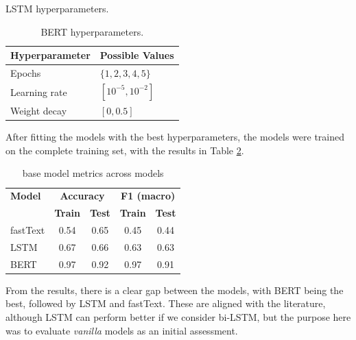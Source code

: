 \documentclass[conference]{IEEEtran}
\begin{document}
\begin{table}[H]
\begin{subtable}[t]{0.45\textwidth}
        \caption{LSTM hyperparameters.}
        \vspace{.1em}
        \label{parameters_baselstm}
    \end{subtable}
    \begin{subtable}[t]{0.45\textwidth}
        \centering
        \begin{tabular}{ll}
        \toprule
        \textbf{Hyperparameter} & \textbf{Possible Values} \\
        \midrule
        Epochs \phantom{abcng disnsin} & $\{1,2,3,4,5\}$ \phantom{onds} \\
        Learning rate & $[10^{-5}, 10^{-2}]$ \\
        Weight decay & $[0, 0.5]$ \\
        \bottomrule
        \end{tabular}
        \vspace{.3em}
        \caption{BERT hyperparameters.}
        \label{parameters_basebert}
    \end{subtable}
\end{table}

After fitting the models with the best hyperparameters, the models were trained on the complete training set, with the results in Table \ref{basemodel_models}.

\begin{table}[H]
\centering
\caption{base model metrics across models}
\label{basemodel_models}
\begin{tabular}{lcccc}
\toprule
\textbf{Model} & \multicolumn{2}{c}{\textbf{Accuracy}} & \multicolumn{2}{c}{\textbf{F1 (macro)}} \\
\cmidrule(lr){2-3} \cmidrule(lr){4-5}
 & \textbf{Train} & \textbf{Test} & \textbf{Train} & \textbf{Test} \\
\midrule
fastText & 0.54 & 0.65 & 0.45 & 0.44 \\
LSTM & 0.67 & 0.66 & 0.63 & 0.63 \\
BERT & 0.97 & 0.92 & 0.97 & 0.91 \\
\bottomrule
\end{tabular}
\end{table}

From the results, there is a clear gap between the models, with BERT being the best, followed by LSTM and fastText. These are aligned with the literature, although LSTM can perform better if we consider bi-LSTM, but the purpose here was to evaluate \textit{vanilla} models as an initial assessment.
\end{document}
